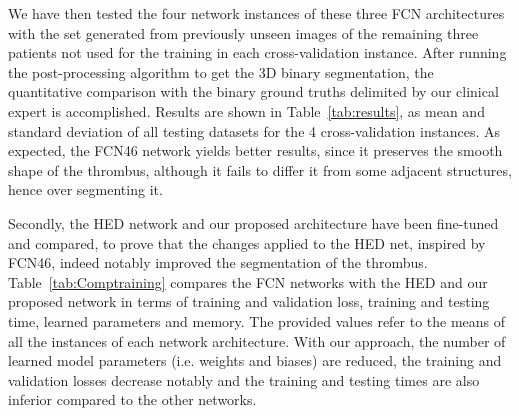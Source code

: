 \documentclass[preprint,authoryear,12pt]{elsarticle}
\begin{document}
We have then tested the four network instances of these three FCN architectures with the set generated from previously unseen images of the remaining three patients not used for the training in each cross-validation instance. After running the post-processing algorithm to get the 3D binary segmentation, the quantitative comparison with the binary ground truths delimited by our clinical expert is accomplished. Results are shown in Table~\ref{tab:results}, as mean and standard deviation of all testing datasets for the 4 cross-validation instances. As expected, the FCN46 network yields better results, since it preserves the smooth shape of the thrombus, although it fails to differ it from some adjacent structures, hence over segmenting it. \par


Secondly, the HED network and our proposed architecture have been fine-tuned and compared, to prove that the changes applied to the HED net, inspired by FCN46, indeed notably improved the segmentation of the thrombus. Table~\ref{tab:Comptraining} compares the FCN networks with the HED and our proposed network in terms of training and validation loss, training and testing time, learned parameters and memory. The provided values refer to the means of all the instances of each network architecture. With our approach, the number of learned model parameters (i.e. weights and biases) are reduced, the training and validation losses decrease notably and the training and testing times are also inferior compared to the other networks.
\end{document}
